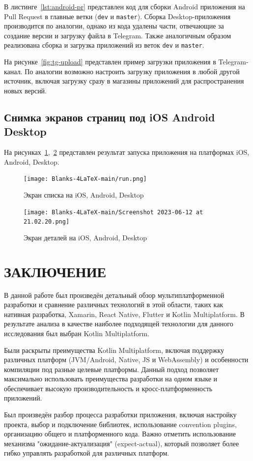 \documentclass[14pt, russian]{scrartcl}
\newcommand{\anonsection}[1]{\cleardoublepage
\phantomsection
\addcontentsline{toc}{section}{\protect\numberline{}#1}
\section*{#1}\vspace*{2.5ex} %
}
\begin{document}
В листинге~\ref{lst:android-pr} представлен код для сборки Android приложения на Pull Request в главные ветки (\texttt{dev} и \texttt{master}). Сборка Desktop-приложения производится по аналогии, однако из кода удалены части, отвечающие за создание версии и загрузку файла в Telegram. Также аналогичным образом реализована сборка и загрузка приложений из веток \texttt{dev} и \texttt{master}.

На рисунке~\ref{fig:tg-upload} представлен пример загрузки приложения в Telegram-канал. По аналогии возможно настроить загрузку приложения в любой другой источник, включая загрузку сразу в магазины приложений для распространения новых версий.

\subsection{Снимка экранов страниц под iOS Android Desktop}

На рисунках~\ref{fig:run},~\ref{fig:run2} представлен результат запуска приложения на платформах iOS, Android, Desktop.

\begin{figure}[!htb]
\centering
  \texttt{[image: Blanks-4LaTeX-main/run.png]}
\caption{Экран списка на iOS, Android, Desktop}
\label{fig:run}
\end{figure}

\begin{figure}[!htb]
\centering
  \texttt{[image: Blanks-4LaTeX-main/Screenshot 2023-06-12 at 21.02.20.png]}
\caption{Экран деталей на iOS, Android, Desktop}
\label{fig:run2}
\end{figure}

\anonsection{ЗАКЛЮЧЕНИЕ} 

В данной работе был произведён детальный обзор мультиплатформенной разработки и сравнение различных технологий в этой области, таких как нативная разработка, Xamarin, React Native, Flutter и Kotlin Multiplatform. В результате анализа в качестве наиболее подходящей технологии для данного исследования был выбран Kotlin Multiplatform.

Были раскрыты преимущества Kotlin Multiplatform, включая поддержку различных платформ (JVM/Android, Native, JS и WebAssembly) и особенности компиляции под разные целевые платформы. Данный подход позволяет максимально использовать преимущества разработки на одном языке и обеспечивает высокую производительность и кросс-платформенность приложений.

Был произведён разбор процесса разработки приложения, включая настройку проекта, выбор и подключение библиотек, использование convention plugins, организацию общего и платформенного кода. Важно отметить использование механизма "ожидание-актуализация" (expect-actual), который позволяет более гибко управлять разработкой для различных платформ.
\end{document}
